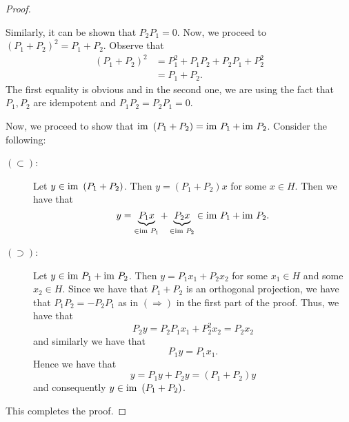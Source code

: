 \begin{proof}
\begin{description}
	    Similarly, it can be shown that $P_{2}P_{1} = 0$. Now, we proceed to $(P_{1} + P_{2})^{2} = P_{1} + P_{2}$. Observe that
	    \begin{align*}
		(P_{1} + P_{2})^{2} &= P_{1}^{2} + P_{1}P_{2} + P_{2}P_{1} + P_{2}^{2} \\
		&= P_{1} + P_{2}.
	    \end{align*}
	    The first equality is obvious and in the second one, we are using the fact that $P_{1}, P_{2}$ are idempotent and $P_{1}P_{2}=P_{2}P_{1} = 0$.
    \end{description}
    Now, we proceed to show that ${\text{im }} \left( P_{1} + P_{2} \right) = {\text{im }} P_{1} + {\text{im }} P_{2}$. Consider the following:
    \begin{description}
	\item[$\left( \subset \right)$:] Let $y \in {\text{im }} \left( P_{1} + P_{2} \right)$. Then $y=\left( P_{1} + P_{2} \right)x$ for some $x\in H$. Then we have that 
	    \begin{equation*}
		y=\underbrace{P_{1}x}_{\in {\text{im }} P_{1}} + \underbrace{P_{2}x}_{\in {\text{im }} P_{2}} \in {\text{im }} P_{1} + {\text{im }} P_{2}.
	    \end{equation*}
	\item[$\left( \supset \right)$:] Let $y\in {\text{im }} P_{1} + {\text{im }} P_{2}$. Then $y= P_{1}x_1 + P_{2}x_{2}$ for some $x_{1} \in H$ and some $x_{2} \in H$. Since we have that $P_{1}+P_{2}$ is an orthogonal projection, we have that $P_{1}P_{2}=-P_{2}P_{1}$ as in $\left( \Longrightarrow \right)$ in the first part of the proof. Thus, we have that
	    \begin{equation*}
		P_{2}y= P_{2}P_{1}x_{1} + P_{2}^{2}x_{2} = P_{2}x_{2}
	    \end{equation*}
	    and similarly we have that
	    \begin{equation*}
		P_{1}y=P_{1}x_{1}.
	    \end{equation*}
	    Hence we have that
	    \begin{equation*}
		y=P_{1}y + P_{2}y = \left( P_{1} + P_{2} \right)y
	    \end{equation*}
	    and consequently $y \in {\text{im }} \left( P_{1} + P_{2} \right)$.
    \end{description}
    This completes the proof.
\end{proof}
